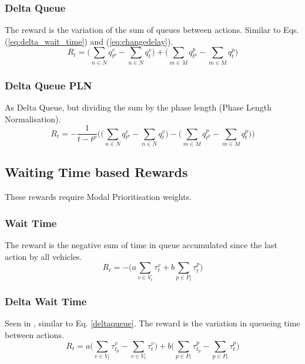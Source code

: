 \documentclass[sigconf,anonymous]{aamas}
\begin{document}
\subsubsection{Delta Queue}
The reward is the variation of the sum of queues between actions.
Similar to Eqs. (\ref{eq:delta_wait_time}) and (\ref{eq:changedelay}).
\begin{equation}
    R_t =  \bigg( \sum_{n \in N} q^v_{t^p} -\sum_{n \in N} q^v_{t} \bigg) +  \bigg( \sum_{m \in M} q^p_{t^p} - \sum_{m \in M} q^p_{t} \bigg)
    \label{deltaqueue}
\end{equation}

\subsubsection{Delta Queue PLN}
As Delta Queue, but dividing the sum by the phase length (Phase Length Normalisation).
\begin{equation}
    R_t = - \frac{1}{t-t^p} \bigg(  \big( \sum_{n \in N} q^v_{t^p} - \sum_{n \in N} q^v_{t} \big) - 
    \big(  \sum_{m \in M} q^p_{t^p}  - \sum_{m \in M} q^p_{t} \big) \bigg)
    \label{queuepln}
\end{equation}

\subsection{Waiting Time based Rewards}
These rewards require Modal Prioritisation weights.
\subsubsection{Wait Time}
The reward is the negative sum of time in queue accumulated since the last action by all vehicles. 
\begin{equation}
R_t = - \bigg(a \sum_{v \in V_t} \tau^v_{t} + b \sum_{p \in P_t} \tau^p_{t} \bigg)
\label{eq:wait_time}
\end{equation}

\subsubsection{Delta Wait Time}
Seen in \cite{liang2018}, similar to Eq. \ref{deltaqueue}. The reward is the variation in queueing time between actions.
\begin{equation}
R_t = a \bigg( \sum_{v \in V_t} \tau^v_{t_p} -  \sum_{v \in V_t} \tau^v_{t} \bigg) + b \bigg( \sum_{p \in P_t} \tau^p_{t_p} -  \sum_{p \in P_t} \tau^p_{t} \bigg)
\label{eq:delta_wait_time}
\end{equation}
\end{document}
